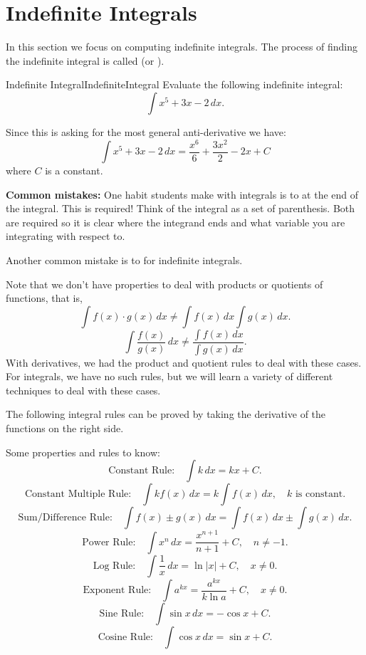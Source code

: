 \section{Indefinite Integrals}\label{sec:IndefInt}

In this section we focus on computing indefinite integrals.
The process of finding the indefinite integral is called  (or ).

\begin{example}{Indefinite Integral}{IndefiniteIntegral}
Evaluate the following indefinite integral:
$$\int x^5+3x-2\,dx.$$
\vspace{-0.5cm}
\end{example}

\begin{solution} 
Since this is asking for the most general anti-derivative we have:
$$\int x^5+3x-2\,dx=\frac{x^6}{6}+\frac{3x^2}{2}-2x+C$$
where $C$ is a constant.
\end{solution}

{\bf Common mistakes:}
One habit students make with integrals is to  at the end of the integral.
This is required! Think of the integral as a set of parenthesis.
Both are required so it is clear where the integrand ends and what variable you are integrating with respect to.

Another common mistake is to  for indefinite integrals.

Note that we don't have properties to deal with products or quotients of functions, that is,
$$\int f(x)\cdot g(x)\,dx\neq \int f(x)\,dx\int g(x)\,dx.$$
$$\int \frac{f(x)}{g(x)}\,dx\neq \frac{\int f(x)\,dx}{\int g(x)\,dx}.$$
With derivatives, we had the product and quotient rules to deal with these cases.
For integrals, we have no such rules, but we will learn a variety of different techniques to deal with these cases.

The following integral rules can be proved by taking the derivative of the functions on the right side.

\begin{formulabox}
Some properties and rules to know:\\
$$\mbox{Constant Rule:}\quad\int k\,dx=kx+C.$$
$$\mbox{Constant Multiple Rule:}\quad\int kf(x)\,dx=k\int f(x)\,dx,\quad\mbox{$k$ is constant}.$$
$$\mbox{Sum/Difference Rule:}\quad\int f(x)\pm g(x)\,dx=\int f(x)\,dx\pm\int g(x)\,dx.$$
$$\mbox{Power Rule:}\quad\int x^n\,dx=\frac{x^{n+1}}{n+1}+C,\quad n\neq -1.$$
$$\mbox{Log Rule:}\quad\int \frac{1}{x}\,dx=\ln|x|+C,\quad x\neq 0.$$
$$\mbox{Exponent Rule:}\quad\int a^{kx}=\frac{a^{kx}}{k\ln a}+C,\quad x\neq 0.$$
$$\mbox{Sine Rule:}\quad\int \sin x\,dx=-\cos x+C.$$
$$\mbox{Cosine Rule:}\quad\int \cos x\,dx=\sin x+C.$$
\end{formulabox}

